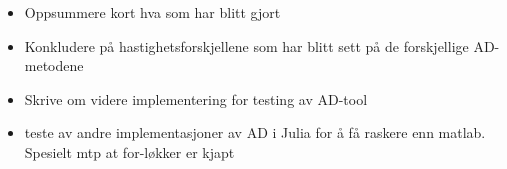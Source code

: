 \begin{itemize}
    \item Oppsummere kort hva som har blitt gjort
    \item Konkludere på hastighetsforskjellene som har blitt sett på de forskjellige AD-metodene
    \item Skrive om videre implementering for testing av AD-tool
    \item teste av andre implementasjoner av AD i Julia for å få raskere enn matlab. Spesielt mtp at for-løkker er kjapt
\end{itemize}